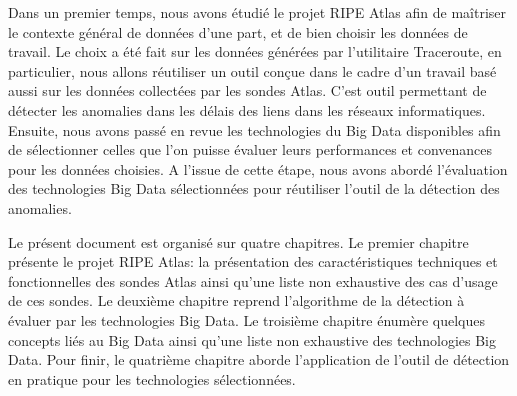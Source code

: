 
Dans un premier temps, nous avons étudié le projet RIPE Atlas afin de maîtriser le contexte général de données d'une part, et de bien choisir les données de travail. Le choix a été fait sur les données générées par l'utilitaire Traceroute, en particulier, nous allons réutiliser un outil conçue dans le cadre d'un travail basé aussi sur les données collectées par les sondes Atlas. C'est outil permettant de détecter les anomalies dans les délais des liens dans les réseaux informatiques. Ensuite, nous avons passé en revue les technologies du Big Data disponibles afin de sélectionner celles que l'on puisse  évaluer leurs performances et convenances pour les données choisies. A l'issue de cette étape, nous avons abordé l'évaluation des technologies Big Data sélectionnées  pour réutiliser l'outil de la détection des anomalies.



Le présent document est organisé sur quatre chapitres. Le premier chapitre présente le projet RIPE Atlas: la présentation des caractéristiques techniques et fonctionnelles des sondes Atlas ainsi qu'une liste non exhaustive des cas d'usage de ces sondes. Le deuxième chapitre reprend l'algorithme de la détection à évaluer par les technologies Big Data.
Le troisième chapitre énumère quelques concepts liés au Big Data ainsi qu'une liste non exhaustive des technologies Big Data. Pour finir, le quatrième chapitre aborde l'application de l'outil de détection en pratique pour les technologies sélectionnées.


